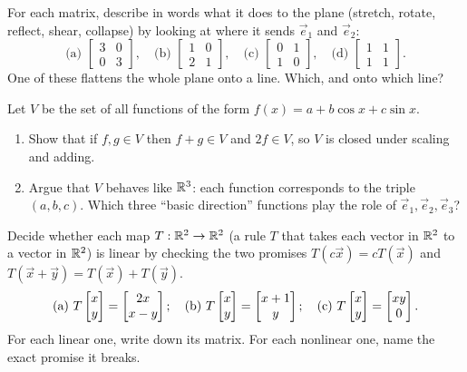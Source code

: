 \begin{exercise}
For each matrix, describe in words what it does to the plane (stretch, rotate, reflect, shear,
collapse) by looking at where it sends $\vec e_1$ and $\vec e_2$:
\[
\text{(a) } \begin{bmatrix} 3 & 0 \\ 0 & 3\end{bmatrix},\quad
\text{(b) } \begin{bmatrix} 1 & 0 \\ 2 & 1\end{bmatrix},\quad
\text{(c) } \begin{bmatrix} 0 & 1 \\ 1 & 0\end{bmatrix},\quad
\text{(d) } \begin{bmatrix} 1 & 1 \\ 1 & 1\end{bmatrix}.
\]
One of these flattens the whole plane onto a line. Which, and onto which line?
\end{exercise}

\begin{exercise}
Let $V$ be the set of all functions of the form $f(x) = a + b\cos x + c\sin x$.
\begin{enumerate}
  \item Show that if $f,g\in V$ then $f+g\in V$ and $2f\in V$, so $V$ is closed under scaling and
  adding.
  \item Argue that $V$ behaves like $\mathbb{R}^3$: each function corresponds to the triple $(a,b,c)$. Which
  three ``basic direction'' functions play the role of $\vec e_1,\vec e_2,\vec e_3$?
\end{enumerate}
\end{exercise}

\begin{exercise}
Decide whether each map $T:\mathbb{R}^2\to\mathbb{R}^2$ (a rule $T$ that takes each vector in $\mathbb{R}^2$ to a vector in $\mathbb{R}^2$) is linear by checking the two promises $T(c\vec x)=cT(\vec x)$
and $T(\vec x+\vec y)=T(\vec x)+T(\vec y)$.
\[
\text{(a) } T\begin{bmatrix}x\\y\end{bmatrix}=\begin{bmatrix}2x\\x-y\end{bmatrix};\quad
\text{(b) } T\begin{bmatrix}x\\y\end{bmatrix}=\begin{bmatrix}x+1\\y\end{bmatrix};\quad
\text{(c) } T\begin{bmatrix}x\\y\end{bmatrix}=\begin{bmatrix}xy\\0\end{bmatrix}.
\]
For each linear one, write down its matrix. For each nonlinear one, name the exact promise it breaks.
\end{exercise}


